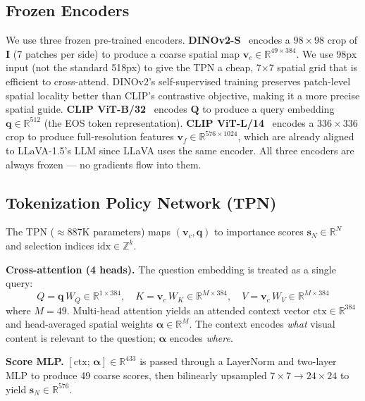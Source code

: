 \documentclass{article}
\newcommand{\vcoarse}{\mathbf{v}_{c}}
\newcommand{\vfine}{\mathbf{v}_{f}}
\newcommand{\qemb}{\mathbf{q}}
\newcommand{\sN}{\mathbf{s}_N}
\begin{document}
\subsection{Frozen Encoders}
\label{sec:encoders}

We use three frozen pre-trained encoders.
\textbf{DINOv2-S}~\cite{oquab2023dinov2} encodes a $98\times98$ crop of $\mathbf{I}$
(7 patches per side) to produce a coarse spatial map
$\vcoarse \in \mathbb{R}^{49 \times 384}$.
We use 98px input (not the standard 518px) to give the TPN a cheap,
7$\times$7 spatial grid that is efficient to cross-attend.
DINOv2's self-supervised training preserves patch-level spatial locality better than
CLIP's contrastive objective, making it a more precise spatial guide.
\textbf{CLIP ViT-B/32}~\cite{radford2021clip} encodes $\mathbf{Q}$ to produce a
query embedding $\qemb \in \mathbb{R}^{512}$ (the EOS token representation).
\textbf{CLIP ViT-L/14}~\cite{radford2021clip} encodes a $336\times336$ crop to
produce full-resolution features $\vfine \in \mathbb{R}^{576 \times 1024}$, which
are already aligned to LLaVA-1.5's LLM since LLaVA uses the same encoder.
All three encoders are always frozen — no gradients flow into them.

\subsection{Tokenization Policy Network (TPN)}
\label{sec:tpn}

The TPN ($\approx$887K parameters) maps $(\vcoarse, \qemb)$ to importance scores
$\sN \in \mathbb{R}^N$ and selection indices $\text{idx} \in \mathbb{Z}^k$.

\textbf{Cross-attention (4 heads).}
The question embedding is treated as a single query:
\[
  Q = \qemb\, W_Q \in \mathbb{R}^{1 \times 384}, \quad
  K = \vcoarse\, W_K \in \mathbb{R}^{M \times 384}, \quad
  V = \vcoarse\, W_V \in \mathbb{R}^{M \times 384}
\]
where $M=49$.
Multi-head attention yields an attended context vector
$\text{ctx} \in \mathbb{R}^{384}$ and head-averaged spatial weights
$\boldsymbol{\alpha} \in \mathbb{R}^{M}$.
The context encodes \emph{what} visual content is relevant to the question;
$\boldsymbol{\alpha}$ encodes \emph{where}.

\textbf{Score MLP.}
$[\text{ctx};\, \boldsymbol{\alpha}] \in \mathbb{R}^{433}$ is passed through a
LayerNorm and two-layer MLP to produce 49 coarse scores, then bilinearly upsampled
$7\times7 \to 24\times24$ to yield $\sN \in \mathbb{R}^{576}$.
\end{document}
